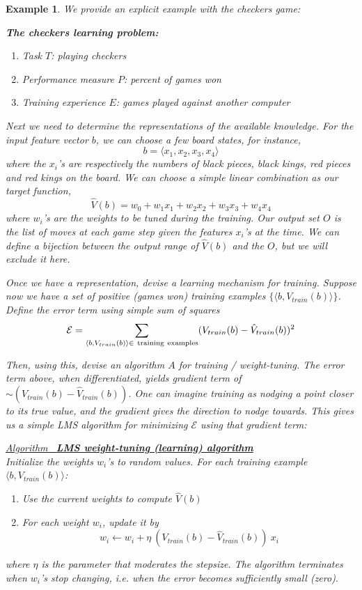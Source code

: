 \documentclass[12pt]{article}  %
\newtheorem{example}{Example}
\newcommand{\algtitle}[1]{\underline{Algorithm \ {\bf #1}} \vspace*{1mm}\\}
\begin{document}
\begin{example}
We provide an explicit example with the checkers game:

{\bf The checkers learning problem:}
\begin{enumerate}
\item Task $T$: playing checkers
\item Performance measure $P$: percent of games won
\item Training experience $E$: games played against another computer
\end{enumerate}

Next we need to determine the representations of the available knowledge. For the input feature vector $b$, we can choose a few board states, for instance, 
$$b = \langle x_1, x_2, x_3, x_4 \rangle$$
where the $x_i$'s are respectively the numbers of black pieces, black kings, red pieces and red kings on the board. We can choose a simple linear combination as our target function,
$$\hat{V}(b) = w_0 + w_1 x_1 + w_2 x_2 + w_3 x_3 + w_4 x_4$$
where $w_i$'s are the weights to be tuned during the training. Our output set $O$ is the list of moves at each game step given the features $x_i$'s at the time. We can define a bijection between the output range of $\hat{V}(b)$ and the $O$, but we will exclude it here.

Once we have a representation, devise a learning mechanism for training. Suppose now we have a set of positive (games won) training examples $\{\langle b, V_{train}(b) \rangle\}$. Define the error term using simple sum of squares $$\mathcal{E} = \sum_{\langle b, V_{train}(b) \rangle \in \ {\rm training\ examples}} (V_{train}(b) - \hat{V}_{train}(b))^2$$

Then, using this, devise an algorithm $A$ for training / weight-tuning. The error term above, when differentiated, yields gradient term of $\sim(V_{train}(b) - \hat{V}_{train}(b))$. One can imagine training as nodging a point closer to its true value, and the gradient gives the direction to nodge towards. This gives us a simple LMS algorithm for minimizing $\mathcal{E}$ using that gradient term:


\algtitle{LMS weight-tuning (learning) algorithm}
Initialize the weights $w_i$'s to random values. For each training example $\langle b, V_{train}(b) \rangle$:
\begin{enumerate}
	\item Use the current weights to compute $\hat{V}(b)$
	\item For each weight $w_i$, update it by $$w_i \leftarrow w_i + \eta \ (V_{train}(b) - \hat{V}_{train}(b)) \ x_i$$
\end{enumerate}

where $\eta$ is the parameter that moderates the stepsize. The algorithm terminates when $w_i$'s stop changing, i.e. when the error becomes sufficiently small (zero).

\end{example}
\end{document}
